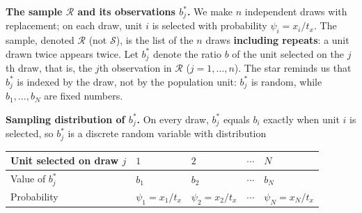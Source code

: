 \documentclass[
  letterpaper,
  DIV=11,
  numbers=noendperiod]{scrreprt}
\newcounter{none} %
\renewcommand{\[}{\begin{equation}}
\renewcommand{\]}{\end{equation}}
\begin{document}
\textbf{The sample \(\mathcal{R}\) and its observations \(b_j^*\).} We
make \(n\) independent draws with replacement; on each draw, unit \(i\)
is selected with probability \(\psi_i=x_i/t_x\). The sample, denoted
\(\mathcal{R}\) (not \(\mathcal{S}\)), is the list of the \(n\) draws
\textbf{including repeats}: a unit drawn twice appears twice. Let
\(b_j^*\) denote the ratio \(b\) of the unit selected on the \(j\)th
draw, that is, the \(j\)th observation in \(\mathcal{R}\)
(\(j=1,\ldots,n\)). The star reminds us that \(b_j^*\) is indexed by the
draw, not by the population unit: \(b_j^*\) is random, while
\(b_1,\ldots,b_N\) are fixed numbers.

\textbf{Sampling distribution of \(b_j^*\).} On every draw, \(b_j^*\)
equals \(b_i\) exactly when unit \(i\) is selected, so \(b_j^*\) is a
discrete random variable with distribution

{\def\LTcaptype{none} %
\begin{longtable}[]{@{}
  >{\raggedright\arraybackslash}p{}
  >{\centering\arraybackslash}p{}
  >{\centering\arraybackslash}p{}
  >{\centering\arraybackslash}p{}
  >{\centering\arraybackslash}p{}@{}}
\toprule\noalign{}
\begin{minipage}[b]{\linewidth}\raggedright
Unit selected on draw \(j\)
\end{minipage} & \begin{minipage}[b]{\linewidth}\centering
\(1\)
\end{minipage} & \begin{minipage}[b]{\linewidth}\centering
\(2\)
\end{minipage} & \begin{minipage}[b]{\linewidth}\centering
\(\cdots\)
\end{minipage} & \begin{minipage}[b]{\linewidth}\centering
\(N\)
\end{minipage} \\
\midrule\noalign{}
\endhead
\bottomrule\noalign{}
\endlastfoot
Value of \(b_j^*\) & \(b_1\) & \(b_2\) & \(\cdots\) & \(b_N\) \\
Probability & \(\psi_1=x_1/t_x\) & \(\psi_2=x_2/t_x\) & \(\cdots\) &
\(\psi_N=x_N/t_x\) \\
\end{longtable}
}
\end{document}
